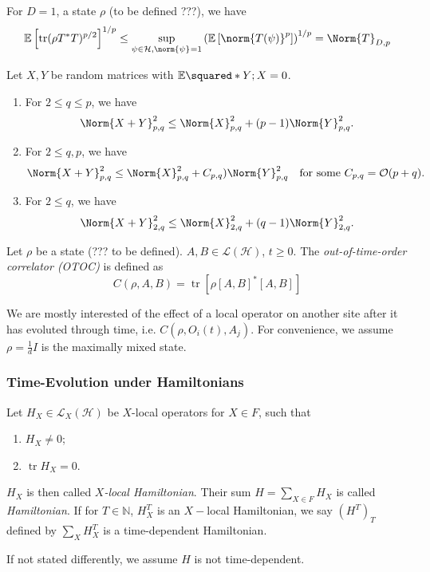 \begin{lem}[]
    For \(D=1\), a state \(\rho\) (to be defined ???), we have
    \[\mathbb{E} \left[\operatorname{tr}(\rho T^{*}T)^{p/2}\right]^{1/p} \leq \sup_{\psi \in \mathcal{H}, \norm{\psi}_{}=1} \left( \mathbb{E} \left[ \norm{T(\psi )}_{}^{p}\right]\right)^{1/p}= \Norm{T}_{D,p} \]
\end{lem}


\begin{fact}
  Let \(X,Y\) be random matrices with \( \mathbb{E} \squared*{Y;X} =0 \). 
  \begin{enumerate}[1)] 
    \item For \(2 \leq q \leq p\), we have 
      \[\Norm{X+Y}_{p,q}^{2} \leq \Norm{X}_{p,q}^{2}+ (p-1)\Norm{Y}_{p,q}^{2}.\]
    \item For \(2 \leq q, p\), we have 
      \[\Norm{X+Y}_{p,q}^{2} \leq \Norm{X}_{p,q}^{2}+ C_{p,q})\Norm{Y}_{p,q}^{2} \quad\text{for some \(C_{p,q}= \mathcal{O}(p+q)\)}.\] 
    \item For \(2 \leq q\), we have 
      \[\Norm{X+Y}_{2,q}^{2} \leq \Norm{X}_{2,q}^{2}+ (q-1)\Norm{Y}_{2,q}^{2}.\]
  \end{enumerate}
\end{fact}


\begin{defn}[OTOC]
    Let \(\rho\) be a state (??? to be defined). \(A,B\in \mathcal{L}(\mathcal{H})\), \(t \geq 0\). The \emph{out-of-time-order correlator (OTOC)} is defined as 
    \[C(\rho, A,B ) = \operatorname{tr} \left[\rho [A,B]^{*}[A,B]\right]\]
\end{defn}
We are mostly interested of the effect of a local operator on another site after it has evoluted through time, i.e. \(C(\rho, O_i(t), A_j)\). For convenience, we assume \(\rho=\frac{1}{d}I\) is the maximally mixed state. 


\subsubsection{Time-Evolution under Hamiltonians}


\begin{defn}[Hamiltonians]
  Let \(H_X\in \mathcal{L}_X(\mathcal{H})\) be \(X\)-local operators  for \(X \in F\), such that
  \begin{enumerate}[1)]
    \item \(H_X \neq 0\); 
    \item \(\operatorname{tr}H_X=0\). 
  \end{enumerate}
  \(H_X\) is then called \emph{\(X\)-local Hamiltonian}. Their sum \(H=\sum_{X\in F}^{} H_X\) is called \emph{Hamiltonian}.
  If for \(T\in \mathbb{N}\), \(H_X^{T}\) is an \(X-\)local Hamiltonian, we say \((H^{T})_T\) defined by \(\sum_{X}^{} H_X^{T}\) is a time-dependent Hamiltonian.
\end{defn}
If not stated differently, we assume \(H\) is not time-dependent.



